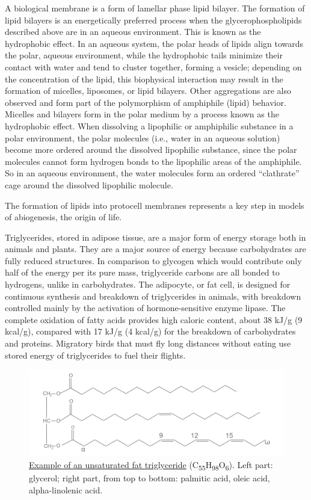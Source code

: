 A biological membrane is a form of lamellar phase lipid bilayer. The formation of lipid bilayers is an energetically preferred process when the glycerophospholipids described above are in an aqueous environment. This is known as the hydrophobic effect. In an aqueous system, the polar heads of lipids align towards the polar, aqueous environment, while the hydrophobic tails minimize their contact with water and tend to cluster together, forming a vesicle; depending on the concentration of the lipid, this biophysical interaction may result in the formation of micelles, liposomes, or lipid bilayers. Other aggregations are also observed and form part of the polymorphism of amphiphile (lipid) behavior. Micelles and bilayers form in the polar medium by a process known as the hydrophobic effect. When dissolving a lipophilic or amphiphilic substance in a polar environment, the polar molecules (i.e., water in an aqueous solution) become more ordered around the dissolved lipophilic substance, since the polar molecules cannot form hydrogen bonds to the lipophilic areas of the amphiphile. So in an aqueous environment, the water molecules form an ordered ``clathrate'' cage around the dissolved lipophilic molecule.

The formation of lipids into protocell membranes represents a key step in models of abiogenesis, the origin of life.

Triglycerides, stored in adipose tissue, are a major form of energy storage both in animals and plants. They are a major source of energy because carbohydrates are fully reduced structures. In comparison to glycogen which would contribute only half of the energy per its pure mass, triglyceride carbons are all bonded to hydrogens, unlike in carbohydrates. The adipocyte, or fat cell, is designed for continuous synthesis and breakdown of triglycerides in animals, with breakdown controlled mainly by the activation of hormone-sensitive enzyme lipase. The complete oxidation of fatty acids provides high caloric content, about 38 kJ/g (9 kcal/g), compared with 17 kJ/g (4 kcal/g) for the breakdown of carbohydrates and proteins. Migratory birds that must fly long distances without eating use stored energy of triglycerides to fuel their flights.



\begin{figure}

{\centering \includegraphics[width=0.7\linewidth]{./figures/chemistry/simple_triglyceride} 

}

\caption{\href{https://commons.wikimedia.org/wiki/File:Fat_triglyceride_shorthand_formula.PNG}{Example of an unsaturated fat triglyceride} (C\textsubscript{55}H\textsubscript{98}O\textsubscript{6}). Left part: glycerol; right part, from top to bottom: palmitic acid, oleic acid, alpha-linolenic acid.}\label{fig:simpletriglyceride}
\end{figure}


